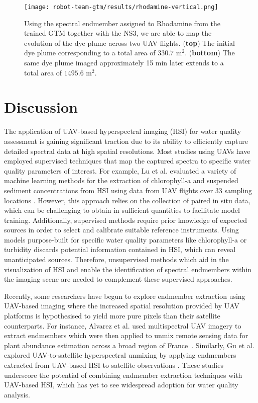 \begin{figure}[H]
  \vspace{-1cm}
  \centering
  \texttt{[image: robot-team-gtm/results/rhodamine-vertical.png]}
  \caption{Using the spectral endmember assigned to Rhodamine from the trained
    GTM together with the NS3, we are able to map the evolution of the dye plume
    across two UAV flights. (\textbf{top}) The initial dye plume corresponding
    to a total area of $330.7$ m$^2$. (\textbf{bottom}) The same dye plume
    imaged approximately 15 min later extends to a total area of $1495.6$
    m$^2$.}
  \label{fig:rhodamine-map}
\end{figure}

\clearpage
\newpage



\section{Discussion}

The application of UAV-based hyperspectral imaging (HSI) for water quality
assessment is gaining significant traction due to its ability to efficiently
capture detailed spectral data at high spatial resolutions. Most studies using
UAVs have employed supervised techniques that map the captured spectra to
specific water quality parameters of interest. For example, Lu et al. evaluated
a variety of machine learning methods for the extraction of chlorophyll-a and
suspended sediment concentrations from HSI using data from UAV flights over 33
sampling locations \cite{lu2021retrieval}. However, this approach relies on the
collection of paired in situ data, which can be challenging to obtain in
sufficient quantities to facilitate model training. Additionally, supervised
methods require prior knowledge of expected sources in order to select and
calibrate suitable reference instruments. Using models purpose-built for
specific water quality parameters like chlorophyll-a or turbidity discards
potential information contained in HSI, which can reveal unanticipated sources.
Therefore, unsupervised methods which aid in the visualization of HSI and enable
the identification of spectral endmembers within the imaging scene are needed to
complement these supervised approaches.

Recently, some researchers have begun to explore endmember extraction using
UAV-based imaging where the increased spatial resolution provided by UAV
platforms is hypothesised to yield more pure pixels than their satellite
counterparts. For instance, Alvarez et al. used multispectral UAV imagery to
extract endmembers which were then applied to unmix remote sensing data for
plant abundance estimation across a broad region of
France~\cite{alvarez2020can}. Similarly, Gu et al. explored UAV-to-satellite
hyperspectral unmixing by applying endmembers extracted from UAV-based HSI to
satellite observations \cite{gu2023intrinsic}. These studies underscore the
potential of combining endmember extraction techniques with UAV-based HSI, which
has yet to see widespread adoption for water quality analysis.

